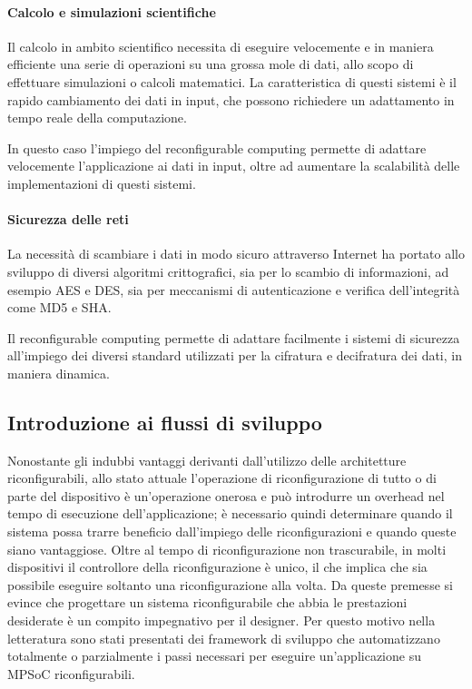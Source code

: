 \paragraph{Calcolo e simulazioni scientifiche}
Il calcolo in ambito scientifico necessita di eseguire velocemente e in maniera efficiente
una serie di operazioni su una grossa mole di dati, allo scopo di effettuare simulazioni o
calcoli matematici. La caratteristica di questi sistemi è il rapido cambiamento dei dati in
input, che possono richiedere un adattamento in tempo reale della computazione.

In questo caso l'impiego del reconfigurable computing permette di adattare velocemente
l'applicazione ai dati in input, oltre ad aumentare la scalabilità delle implementazioni
di questi sistemi.


\paragraph{Sicurezza delle reti}
La necessità di scambiare i dati in modo sicuro attraverso Internet ha portato allo sviluppo
di diversi algoritmi crittografici, sia per lo scambio di informazioni, ad esempio
\ac{AES} e \ac{DES}, sia per meccanismi di autenticazione e verifica dell'integrità come
MD5 e \ac{SHA}.

Il reconfigurable computing permette di adattare facilmente i sistemi di sicurezza
all'impiego dei diversi standard utilizzati per la cifratura e decifratura dei dati, in
maniera dinamica.


\subsection{Introduzione ai flussi di sviluppo}
\label{subsec:introFlussi}


Nonostante gli indubbi vantaggi derivanti dall'utilizzo delle architetture riconfigurabili,
allo stato attuale l'operazione di riconfigurazione di tutto o di parte del dispositivo \`e
un'operazione onerosa e pu\`o introdurre un overhead nel tempo di esecuzione dell'applicazione;
\`e necessario quindi determinare quando il sistema possa trarre beneficio dall'impiego delle
riconfigurazioni e quando queste siano vantaggiose. Oltre al tempo di riconfigurazione non trascurabile,
in molti dispositivi il controllore della riconfigurazione \`e unico, il che implica che sia possibile
eseguire soltanto una riconfigurazione alla volta.
Da queste premesse si evince che progettare un sistema riconfigurabile che abbia le prestazioni desiderate
\`e un compito impegnativo per il designer. Per questo motivo nella letteratura sono stati presentati dei framework
di sviluppo che automatizzano totalmente o parzialmente i passi necessari per eseguire un'applicazione
su MPSoC riconfigurabili.

